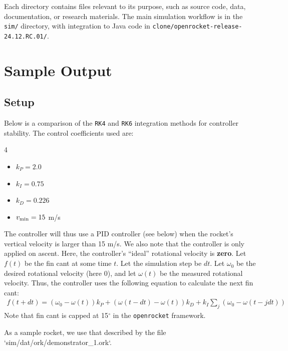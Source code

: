\documentclass{amsdtx}
\begin{document}
{Each directory contains files relevant to its purpose, such as source
code, data, documentation, or research materials. The main simulation
workflow is in the \texttt{sim/} directory, with integration to Java
code in \texttt{clone/openrocket-release-24.12.RC.01/}.
\newpage
\section{Sample Output}
\subsection{Setup}
Below is a comparison of the \verb|RK4| and \verb|RK6| integration methods for controller stability. The control coefficients used are:
\begin{multicols}{4}
\begin{itemize}
  \item $k_P=2.0$
  \item $k_I=0.75$
  \item $k_D=0.226$
  \item $v_{\rm min}=15$ m/s
\end{itemize}
\end{multicols}
The controller will thus use a PID controller (see below) when the rocket's vertical velocity is larger than 15 m/s. We also note that the controller is only applied on ascent. Here, the controller's ``ideal'' rotational velocity is \textbf{zero}. Let $f(t)$ be the fin cant at some time $t$. Let the simulation step be $dt$. Let $\omega_0$ be the desired rotational velocity (here $0$), and let $\omega(t)$ be the measured rotational velocity. Thus, the controller uses the following equation to calculate the next fin cant:
\begin{align}
  f(t+dt) = (\omega_0-\omega(t))k_P + (\omega(t-dt)-\omega(t))k_D + k_I\sum_j(\omega_0-\omega(t-jdt))
\end{align}
Note that fin cant is capped at 15$^\circ$ in the \verb|openrocket| framework.

As a sample rocket, we use that described by the file `sim/dat/ork/demonstrator_1.ork`.
}
\end{document}

